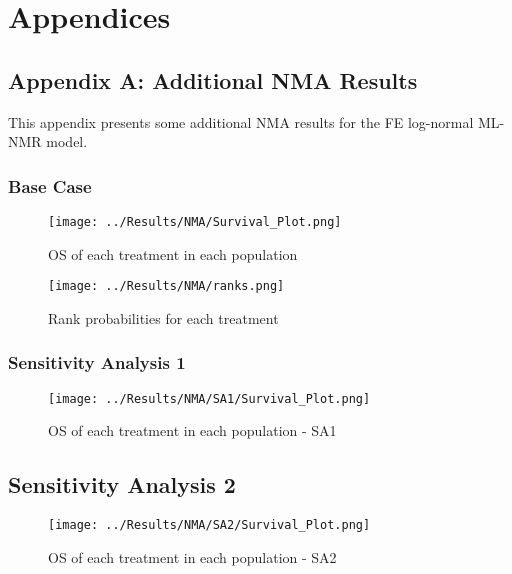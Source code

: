 \chapter{Appendices}\label{appChap}

\section{Appendix A: Additional NMA Results}\label{NMAAppendix}

This appendix presents some additional NMA results for the FE log-normal ML-NMR model. 

\subsection{Base Case}

\begin{figure}[h]
    \centering
    \texttt{[image: ../Results/NMA/Survival\_Plot.png]}
    \caption{OS of each treatment in each population}
    \label{fig:pred_survbc}
\end{figure}

\begin{figure}[h]
    \centering
    \texttt{[image: ../Results/NMA/ranks.png]}
    \caption{Rank probabilities for each treatment}
    \label{fig:rankplot}
\end{figure}

\clearpage
\subsection{Sensitivity Analysis 1}

\begin{figure}[h]
    \centering
    \texttt{[image: ../Results/NMA/SA1/Survival\_Plot.png]}
    \caption{OS of each treatment in each population - SA1}
    \label{fig:pred_survSA1}
\end{figure}

\clearpage
\section{Sensitivity Analysis 2}

\begin{figure}[h]
    \centering
    \texttt{[image: ../Results/NMA/SA2/Survival\_Plot.png]}
    \caption{OS of each treatment in each population - SA2}
    \label{fig:pred_survSA2}
\end{figure}

